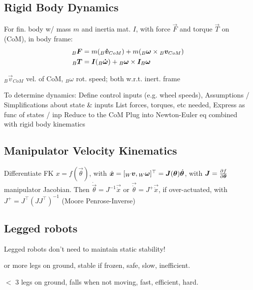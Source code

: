 \subsection{Rigid Body Dynamics}
\label{sec:rigid-body-dynamics}
\shortdefinition[Newton II] For fin. body w/ mass $m$ and inertia mat. $I$, with force $\vec{F}$ and torque $\vec{T}$ on  (CoM), in body frame:
\begin{align*}
    {_B}\bm{F} & = m({_B} \bm{\dot{v}}_{CoM}) + m ({_B}\bm{\omega} \times {_B}\bm{v}_{CoM})       \\
    {_B}\bm{T} & = \bm{I}({_B} \bm{\dot{\omega}}) + {_B} \bm{\omega} \times \bm{I}_B\bm{\omega}
\end{align*}

${_B} \vec{v}_{CoM}$ vel. of CoM, ${_B}\omega$ rot. speed; both w.r.t. inert. frame

To determine dynamics:
 Define control inputs (e.g. wheel speeds),
 Assumptions / Simplifications about state \& inputs
 List forces, torques, etc needed,
 Express as func of states / inp
 Reduce to the CoM
 Plug into Newton-Euler eq combined with rigid body kinematics

\subsection{Manipulator Velocity Kinematics}
\label{sec:manipulator-velocity-kinematics}
Differentiate FK $x = f(\vec{\theta})$, with $\dot{\bm{x}} = [{_W}\bm{v}, {_W} \bm{\omega}]^\top = \bm{J}(\bm{\theta})\dot{\bm{\theta}}$,
with $\bm{J} = \frac{\partial f}{\partial \bm{\theta}}$ manipulator Jacobian. Then $\dot{\vec{\theta}} = J^{-1} \vec{\dot{x}}$ or $\vec{\dot{\theta}} = J^+ \vec{\dot{x}}$,
if over-actuated, with $J^+ = J^\top(J J^\top)^{-1}$ (Moore Penrose-Inverse)


\newpage
\subsection{Legged robots}
{\scriptsize Legged robots don't need to maintain static stability!}

 or more legs on ground, stable if frozen, safe, slow, inefficient.

 $<$ 3 legs on ground, falls when not moving, fast, efficient, hard.
